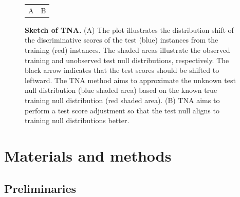 \documentclass[10pt,letterpaper]{article}
\begin{document}
\begin{figure}
	\centering
	\begin{tabular}{cc}
		A & B  \\
	\end{tabular}
	\caption{{\bf Sketch of TNA. } (A) The plot illustrates the distribution shift of the discriminative scores of the test (blue) instances from the training (red) instances.
	The shaded areas illustrate the observed training and unobserved test null distributions, respectively.
	The black arrow indicates that the test scores should be shifted to leftward.
	The TNA method aims to approximate the unknown test null distribution (blue shaded area) based on the known true training null distribution (red shaded area).
	(B) TNA aims to perform a test score adjustment so that the test null aligns to training null distributions better. }
	\label{fig:tna_sketch}
\end{figure}


\section*{Materials and methods}
\subsection*{Preliminaries}
\end{document}
